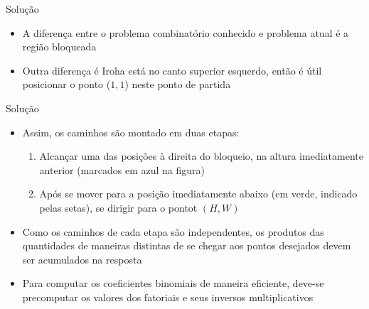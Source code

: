 \begin{frame}[fragile]{Solução}

    \begin{itemize}
        \item A diferença entre o problema combinatório conhecido e problema atual é a região
            bloqueada

        \item Outra diferença é Iroha está no canto superior esquerdo, então é útil posicionar o 
            ponto ($1, 1$) neste ponto de partida 

%            

    \end{itemize}

\end{frame}

\begin{frame}[fragile]{Solução}

    \begin{itemize}
        \item Assim, os caminhos são montado em duas etapas:
        \begin{enumerate}
            \item Alcançar uma das posições à direita do bloqueio, na altura imediatamente 
                anterior (marcados em azul na figura)

            \item Após se mover para a posição imediatamente abaixo (em verde, indicado pelas
                setas), se dirigir para o pontot $(H, W)$
        \end{enumerate}

        \item Como os caminhos de cada etapa são independentes, os produtos das quantidades de
            maneiras distintas de se chegar aos pontos desejados devem ser acumulados
            na resposta

        \item Para computar os coeficientes binomiais de maneira eficiente, deve-se precomputar
            os valores dos fatoriais e seus inversos multiplicativos 
    \end{itemize}

\end{frame}


